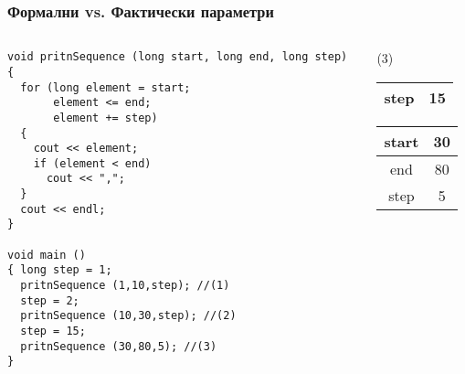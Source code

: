 \documentclass{beamer}
\begin{document}
\begin{frame}[fragile]
\frametitle{Формални vs. Фактически параметри}



\begin{columns}[t]
  \begin{column}{0.75\textwidth}

\begin{lstlisting}
void pritnSequence (long start, long end, long step)
{
  for (long element = start; 
       element <= end;  
       element += step)
  {
    cout << element;
    if (element < end)
      cout << ",";
  }  
  cout << endl;
}

void main ()
{ long step = 1;
  pritnSequence (1,10,step); //(1)
  step = 2;
  pritnSequence (10,30,step); //(2)
  step = 15;
  pritnSequence (30,80,5); //(3)
}
\end{lstlisting}


  \end{column}
  \begin{column}{0.25\textwidth}

    \alert{(3)}

    \begin{tabular}{|c|c|}
    step & 15 \\\hline

    \end{tabular}
    \pause
    \begin{tabular}{|c|c|}
    start & 30 \\\hline
    end & 80 \\\hline
    step & 5 \\\hline

    \end{tabular}
  \end{column}
\end{columns}

\end{frame}
\end{document}

